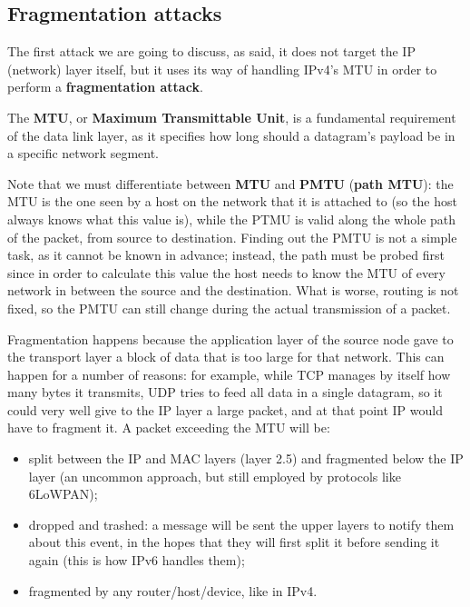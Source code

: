 
\subsection{Fragmentation attacks}
The first attack we are going to discuss, as said, it does not target the IP (network) layer itself, but it uses its way of handling IPv4’s MTU in order to perform a \textbf{fragmentation attack}.

The \textbf{MTU}, or \textbf{Maximum Transmittable Unit}, is a fundamental requirement of the data link layer, as it specifies how long should a datagram’s payload be in a specific network segment.

Note that we must differentiate between \textbf{MTU} and \textbf{PMTU} (\textbf{path MTU}): the MTU is the one seen by a host on the network that it is attached to (so the host always knows what this value is), while the PTMU is valid along the whole path of the packet, from source to destination. Finding out the PMTU is not a simple task, as it cannot be known in advance; instead, the path must be probed first since in order to calculate this value the host needs to know the MTU of every network in between the source and the destination. What is worse, routing is not fixed, so the PMTU can still change during the actual transmission of a packet.

Fragmentation happens because the application layer of the source node gave to the transport layer a block of data that is too large for that network. This can happen for a number of reasons: for example, while TCP manages by itself how many bytes it transmits, UDP tries to feed all data in a single datagram, so it could very well give to the IP layer a large packet, and at that point IP would have to fragment it. A packet exceeding the MTU will be:

\begin{itemize}
	\item split between the IP and MAC layers (layer 2.5) and fragmented below the IP layer (an uncommon approach, but still employed by protocols like 6LoWPAN);
	\item dropped and trashed: a message will be sent the upper layers to notify them about this event, in the hopes that they will first split it before sending it again (this is how IPv6 handles them);
	\item fragmented by any router/host/device, like in IPv4.
\end{itemize}

